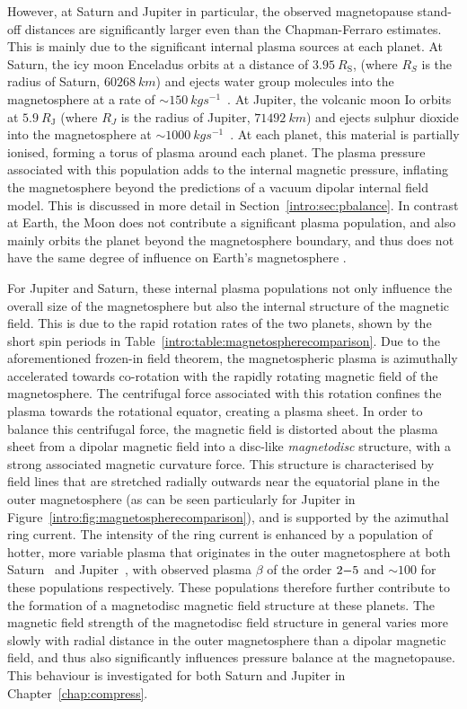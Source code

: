 However, at Saturn and Jupiter in particular, the observed magnetopause stand-off distances are significantly larger even than the Chapman-Ferraro estimates. This is mainly due to the significant internal plasma sources at each planet. At Saturn, the icy moon Enceladus orbits at a distance of $\SI{3.95}{R_\mathrm{S}}$, (where $\si{R_S}$ is the radius of Saturn, $\SI{60268}{km}$) and ejects water group molecules into the magnetosphere at a rate of ${\sim}\SI{150}{kg s^{-1}}$~\citep{tokar2006,dougherty2006}. At Jupiter, the volcanic moon Io orbits at $\SI{5.9}{R_\mathrm{J}}$ (where $\si{R_J}$ is the radius of Jupiter, $\SI{71492}{km}$) and ejects sulphur dioxide into the magnetosphere at ${\sim}\SI{1000}{kg s^{-1}}$~\citep{bagenal2011}. At each planet, this material is partially ionised, forming a torus of plasma around each planet. The plasma pressure associated with this population adds to the internal magnetic pressure, inflating the magnetosphere beyond the predictions of a vacuum dipolar internal field model. This is discussed in more detail in Section~\ref{intro:sec:pbalance}. In contrast at Earth, the Moon does not contribute a significant plasma population, and also mainly orbits the planet beyond the magnetosphere boundary, and thus does not have the same degree of influence on Earth's magnetosphere \citep[e.g.][]{schneider1967}.

For Jupiter and Saturn, these internal plasma populations not only influence the overall size of the magnetosphere but also the internal structure of the magnetic field. This is due to the rapid rotation rates of the two planets, shown by the short spin periods in Table~\ref{intro:table:magnetospherecomparison}. Due to the aforementioned frozen-in field theorem, the magnetospheric plasma is azimuthally accelerated towards co-rotation with the rapidly rotating magnetic field of the magnetosphere. The centrifugal force associated with this rotation confines the plasma towards the rotational equator, creating a plasma sheet. In order to balance this centrifugal force, the magnetic field is distorted about the plasma sheet from a dipolar magnetic field into a disc-like \textit{magnetodisc} structure, with a strong associated magnetic curvature force. This structure is characterised by field lines that are stretched radially outwards near the equatorial plane in the outer magnetosphere (as can be seen particularly for Jupiter in Figure~\ref{intro:fig:magnetospherecomparison}), and is supported by the azimuthal ring current. The intensity of the ring current is enhanced by a population of hotter, more variable plasma that originates in the outer magnetosphere at both Saturn~\citep[e.g.][]{sergis2010} and Jupiter~\citep[e.g.][]{mauk2004}, with observed plasma $\beta$ of the order $2{\--}5$ and ${\sim}100$ for these populations respectively. These populations therefore further contribute to the formation of a magnetodisc magnetic field structure at these planets. The magnetic field strength of the magnetodisc field structure in general varies more slowly with radial distance in the outer magnetosphere than a dipolar magnetic field, and thus also significantly influences pressure balance at the magnetopause. This behaviour is investigated for both Saturn and Jupiter in Chapter~\ref{chap:compress}. 


